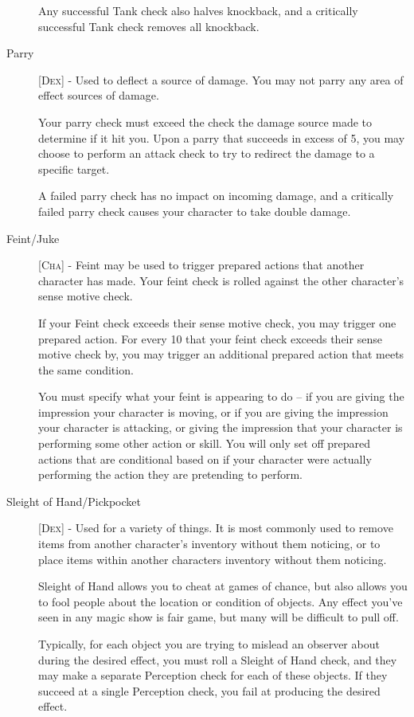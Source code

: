 \begin{description}
Any successful Tank check also halves knockback, and a critically successful Tank check removes all knockback.

\item[Parry] [\textsc{Dex}] - Used to deflect a source of damage. You may not parry any area of effect sources of damage.

Your parry check must exceed the check the damage source made to determine if it hit you. Upon a parry that succeeds in excess of 5, you may choose to perform an attack check to try to redirect the damage to a specific target.

A failed parry check has no impact on incoming damage, and a critically failed parry check causes your character to take double damage.

\item[Feint/Juke] [\textsc{Cha}] - Feint may be used to trigger prepared actions that another character has made. Your feint check is rolled against the other character’s sense motive check.

If your Feint check exceeds their sense motive check, you may trigger one prepared action. For every 10 that your feint check exceeds their sense motive check by, you may trigger an additional prepared action that meets the same condition.

You must specify what your feint is appearing to do -- if you are giving the impression your character is moving, or if you are giving the impression your character is attacking, or giving the impression that your character is performing some other action or skill. You will only set off prepared actions that are conditional based on if your character were actually performing the action they are pretending to perform.

\item[Sleight of Hand/Pickpocket] [\textsc{Dex}] - Used for a variety of things. It is most commonly used to remove items from another character’s inventory without them noticing, or to place items within another characters inventory without them noticing.

Sleight of Hand allows you to cheat at games of chance, but also allows you to fool people about the location or condition of objects.
Any effect you’ve seen in any magic show is fair game, but many will be difficult to pull off.

Typically, for each object you are trying to mislead an observer about during the desired effect, you must roll a Sleight of Hand check, and they may make a separate Perception check for each of these objects. If they succeed at a single Perception check, you fail at producing the desired effect.


\end{description}
